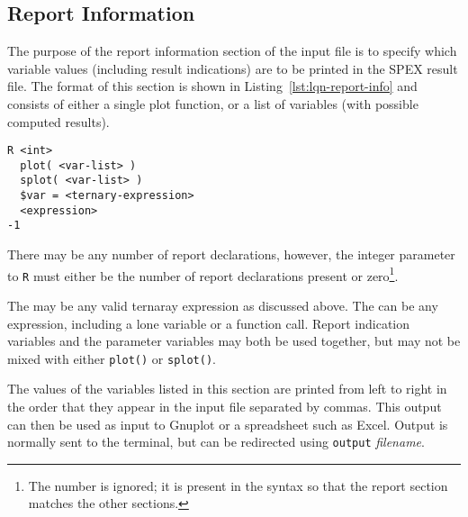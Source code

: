 \label{sec:spex-variables|)}

\subsection{Report Information}
\label{sec:lqn-report-information}

The purpose of the report information section of the input file is to specify which variable values
(including result indications) are to be printed in the SPEX result file.  The format of this section is
shown in Listing~\ref{lst:lqn-report-info} and consists of either a single plot
function, or a list of variables (with possible computed results).  

\lstset{language=LQN,basicstyle=\ttfamily,numbersep=10pt,firstnumber=1}
\begin{lstlisting}[caption={Report Information},label=lst:lqn-report-info,frame=single,float]
R <int>
  plot( <var-list> )
  splot( <var-list> )
  $var = <ternary-expression>
  <expression>
-1
\end{lstlisting}

There may be any number of report declarations, however, the integer parameter to \texttt{R} must either be
the number of report declarations present or zero\footnote{The number is ignored; it is present in the
syntax so that the report section matches the other sections.}.

The  may be any valid ternaray expression as discussed above.  The
 can be any expression, including a lone variable or a function call.  Report
indication variables and the parameter
variables may both be used together, but may not be mixed with either
\texttt{plot()} or \texttt{splot()}.

The values of the variables listed in this
section are printed from left to right in the order that they appear in the input file separated by commas.
This output can then be used as input to Gnuplot or a spreadsheet such as
Excel.  Output is normally sent to the terminal, but can be redirected using \texttt{output} \emph{filename}.

